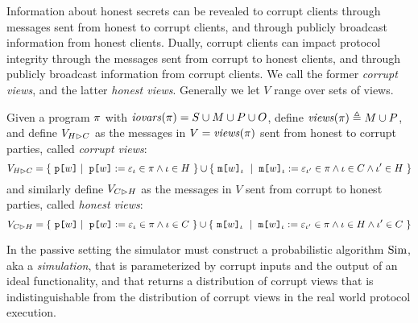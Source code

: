 Information about honest secrets can be revealed to corrupt clients
through messages sent from honest to corrupt clients, and through
publicly broadcast information from honest clients. Dually,
corrupt clients can impact protocol integrity through the messages
sent from corrupt to honest clients, and through publicly broadcast information
from corrupt clients. We call the former \emph{corrupt views}, and
the latter \emph{honest views}. Generally we let $V$ range over sets
of views.
\begin{definition}
  Given a program $\pi$ with $\mathit{iovars}(\pi) = S \cup M \cup P \cup O$,
  define $\mathit{views}(\pi) \triangleq M \cup P$, and define $V_{H \rhd C}$ as the messages in
  $V = \mathit{views}(\pi)$ sent from honest
  to corrupt parties, called \emph{corrupt views}:
  $$
  \houtputs = \{\ \rvl{w} \mid\ \reveal{w}{\be}{\cid} \in \prog
  \wedge \cid \in H \ \} 
  \cup \{\ \elab{\mesg{w}}{\cid}\ \mid\  \eassign{\mesg{w}}{\cid}{\be}{\cid'} \in \prog
  \wedge \cid \in C \wedge \cid' \in H \ \} 
  $$
  and similarly define $V_{C \rhd H}$ as the messages in $V$ sent from corrupt to honest
  parties, called \emph{honest views}:
  $$
  \cinputs = \{\ \rvl{w} \mid\ \reveal{w}{\be}{\cid} \in \prog
  \wedge \cid \in C \ \} 
  \cup \{\ \elab{\mesg{w}}{\cid}\ \mid\  \eassign{\mesg{w}}{\cid}{\be}{\cid'} \in \prog
  \wedge \cid \in H \wedge \cid' \in C \ \} 
  $$
\end{definition}

In the passive setting the simulator must construct a probabilistic
algorithm $\mathrm{Sim}$, aka a \emph{simulation}, that is parameterized by
corrupt inputs and the output of an ideal functionality, and that
returns a distribution of corrupt views that is indistinguishable
from the distribution of corrupt views in the real world
protocol execution.

